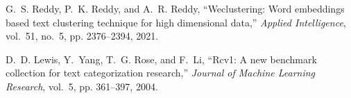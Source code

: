 \documentclass[letterpaper, 10 pt, conference]{ieeeconf}  %
\begin{document}
\begin{thebibliography}{10}
        G.~S. Reddy, P.~K. Reddy, and A.~R. Reddy, ``Weclustering: Word embeddings
        based text clustering technique for high dimensional data,'' \emph{Applied
                Intelligence}, vol.~51, no.~5, pp. 2376--2394, 2021.

        D.~D. Lewis, Y.~Yang, T.~G. Rose, and F.~Li, ``Rcv1: A new benchmark collection
        for text categorization research,'' \emph{Journal of Machine Learning
                Research}, vol.~5, pp. 361--397, 2004.

\end{thebibliography}


% 
\end{document}
